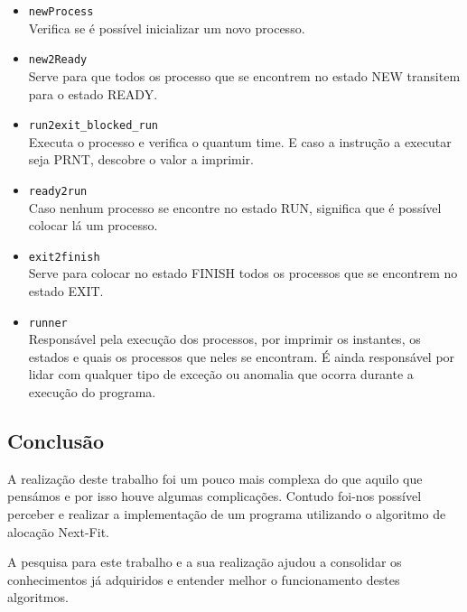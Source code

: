 \documentclass{article}
\begin{document}
\begin{itemize}
    \item \verb|newProcess|\\
    Verifica se é possível inicializar um novo processo.
    \item \verb|new2Ready|\\
    Serve para que todos os processo que se encontrem no estado NEW transitem para o estado READY.
    \item \verb|run2exit_blocked_run|\\
    Executa o processo e verifica o quantum time. E caso a instrução a executar seja PRNT, descobre o valor a imprimir. 
    \item \verb|ready2run|\\
    Caso nenhum processo se encontre no estado RUN, significa que é possível colocar lá um processo.  
    \item \verb|exit2finish|\\
    Serve para colocar no estado FINISH todos os processos que se encontrem no estado EXIT.
    \item \verb|runner|\\
    Responsável pela execução dos processos, por imprimir os instantes, os estados e quais os processos que neles se encontram. É ainda responsável por lidar com qualquer tipo de exceção ou anomalia que ocorra durante a execução do programa.
\end{itemize}

\begin{center}
    \section*{Conclusão}
\end{center}

A realização deste trabalho foi um pouco mais complexa do que aquilo que pensámos e por isso houve algumas complicações. Contudo foi-nos possível perceber e realizar a implementação de um programa utilizando o algoritmo de alocação Next-Fit.

A pesquisa para este trabalho e a sua realização ajudou a consolidar os conhecimentos já adquiridos e entender melhor o funcionamento destes algoritmos.
\paragraph{}
\nocite{aulas}



\end{document}
